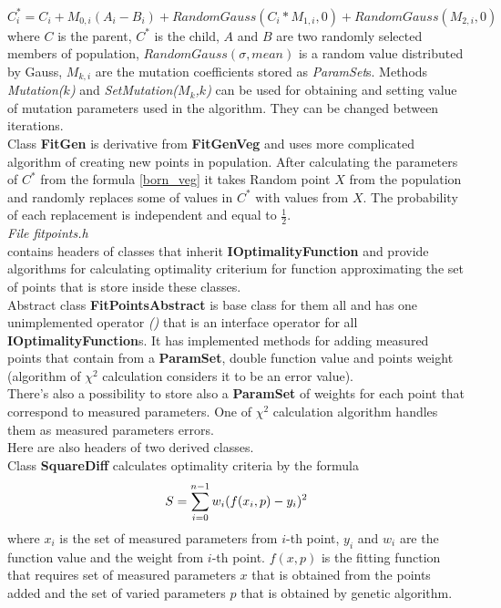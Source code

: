 \documentclass[a4paper]{article}
\begin{document}
\begin{equation}
C^*_i = C_i + 
M_{0,i}(A_i - B_i) + 
RandomGauss(C_i * M_{1,i},0) + 
RandomGauss(M_{2,i},0) 
\label{born_veg}
\end{equation}
where $C$ is the parent, $C^*$ is the child, $A$ and $B$ are two randomly selected members of population, $RandomGauss(\sigma, mean)$ is a random value distributed by Gauss, $M_{k,i}$ are the mutation coefficients stored as \textit{ParamSet}s.
Methods \textit{Mutation($k$)} and \textit{SetMutation($M_k$,$k$)} can be used for obtaining and setting value of mutation parameters used in the algorithm. They can be changed between iterations.
\\
Class \textbf{FitGen} is derivative from \textbf{FitGenVeg} and uses more complicated algorithm of creating new points in population. After calculating the parameters of $C^*$ from the formula \ref{born_veg} it takes Random point $X$ from the population and randomly replaces some of values in $C^*$ with values from $X$. The probability of each replacement is independent and equal to $\frac{1}{2}$.
\\
\textit{\Large File fitpoints.h}\\
contains headers of classes that inherit \textbf{IOptimalityFunction} and provide algorithms for calculating optimality criterium for function approximating the set of points that is store inside these classes.
\\
Abstract class \textbf{FitPointsAbstract} is base class for them all and has one unimplemented operator \textit{()} that is an interface operator for all \textbf{IOptimalityFunction}s. It has implemented methods for adding measured points that contain from a \textbf{ParamSet}, double function value and points weight (algorithm of $\chi^2$ calculation considers it to be an error value).
\\
There's also a possibility to store also a \textbf{ParamSet} of weights for each point that correspond to measured parameters.
One of $\chi^2$ calculation algorithm handles them as measured parameters errors.
\\
Here are also headers of two derived classes.\\
Class \textbf{SquareDiff} calculates optimality criteria by the formula
\begin{equation}\Large
S = \sum_{i=0}^{n-1} w_i (f(x_i, p)-y_i)^2
\end{equation}
where $x_i$ is the set of measured parameters from $i$-th point, $y_i$ and $w_i$ are the function value and the weight from $i$-th point. $f(x,p)$ is the fitting function that requires set of measured parameters $x$ that is obtained from the points added and the set of varied parameters $p$ that is obtained by genetic algorithm.
\end{document}
